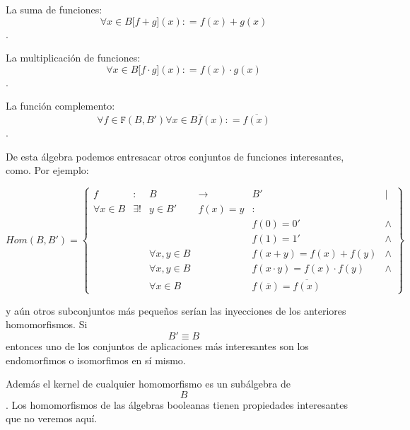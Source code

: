 \begin{enumerate}
  La suma de funciones:
  \[\forall{x \in B}{\lbrack{f + g}\rbrack}{(x)}{: = f}{{(x)} + g}{(x)}\]
  .

  La multiplicación de funciones:
  \[\forall{x \in B}{\lbrack{f \cdot g}\rbrack}{(x)}{: = f}{{(x)} \cdot g}{(x)}\].

  La función complemento:
  \[\forall{f \in \mathtt{F}}{({B,B'})}\forall{x \in B}\overline{f}{(x)}{: = \overline{f{(x)}}}\].

  De esta álgebra podemos entresacar otros conjuntos de funciones
  interesantes, como. Por ejemplo:

  \[{\mathtt{\mathit{Hom}}{({B,B'})}} = \begin{Bmatrix}
  f & : & B & \rightarrow & {B'} & \mathbf{\mid} \\
  {\forall{x \in B}} & {\exists!} & {{y \in B}'} & {f{{(x)} = y}} & \mathbf{\mathrm{:}} & \\
   & & & & {f{{(0)} = 0}'} & \land \\
   & & & & {f{{(1)} = 1}'} & \land \\
   & & {\forall x,{y \in B}} & & {f{{({x + y})} = f}{{(x)} + f}{(y)}} & \land \\
   & & {\forall x,{y \in B}} & & {f{{({x \cdot y})} = f}{{(x)} \cdot f}{(y)}} & \land \\
   & & {\forall{x \in B}} & & {f{{(\overline{x})} = \overline{f{(x)}}}} & 
  \end{Bmatrix}\]

  y aún otros subconjuntos más pequeños serían las inyecciones de los
  anteriores homomorfismos. Si \[{B'} \equiv B\]entonces uno de los
  conjuntos de aplicaciones más interesantes son los endomorfimos o
  isomorfimos en sí mismo.

  Además el kernel de cualquier homomorfismo es un subálgebra de \[B\].
  Los homomorfismos de las álgebras booleanas tienen propiedades
  interesantes que no veremos aquí.
\end{enumerate}
